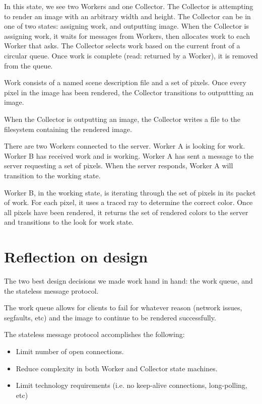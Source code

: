 \documentclass[letterpaper,twocolumn,10pt]{article}
\begin{document}
In this state, we see two Workers and one Collector. The Collector is attempting
to render an image with an arbitrary width and height. The Collector can be in
one of two states: assigning work, and outputting image. When the Collector is
assigning work, it waits for messages from Workers, then allocates work to each
Worker that asks. The Collector selects work based on the current front of a
circular queue. Once work is complete (read: returned by a Worker), it is
removed from the queue.

Work consists of a named scene description file and a set of pixels. Once every
pixel in the image has been rendered, the Collector transitions to outputtting
an image.

When the Collector is outputting an image, the Collector writes a file to the
filesystem containing the rendered image.

There are two Workers connected to the server. Worker A is looking for work.
Worker B has received work and is working. Worker A has sent a message to the
server requesting a set of pixels. When the server responds, Worker A will
transition to the working state.

Worker B, in the working state, is iterating through the set of pixels in its
packet of work. For each pixel, it uses a traced ray to determine the correct
color. Once all pixels have been rendered, it returns the set of rendered colors
to the server and transitions to the look for work state.

\section{Reflection on design}

The two best design decisions we made work hand in hand: the work queue, and the
stateless message protocol.

The work queue allows for clients to fail for whatever reason (network issues,
segfaults, etc) and the image to continue to be rendered successfully.

The stateless message protocol accomplishes the following:

\begin{itemize}
\item Limit number of open connections.
\item Reduce complexity in both Worker and Collector state machines.
\item Limit technology requirements (i.e. no keep-alive connections,
  long-polling, etc)
\end{itemize}
\end{document}
